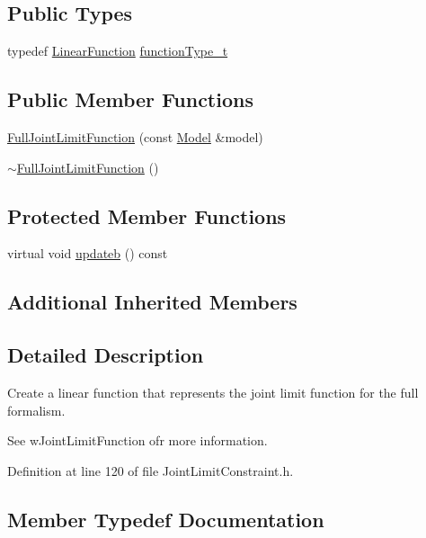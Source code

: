 \subsection*{Public Types}
\begin{DoxyCompactItemize}
\item 
typedef \hyperlink{classocra_1_1LinearFunction}{Linear\+Function} \hyperlink{classocra_1_1FullJointLimitFunction_a3ae743a316981d67933248a9d58f58fb}{function\+Type\+\_\+t}
\end{DoxyCompactItemize}
\subsection*{Public Member Functions}
\begin{DoxyCompactItemize}
\item 
\hyperlink{classocra_1_1FullJointLimitFunction_af49c77d067fe584cf6d3884eb33b2ed0}{Full\+Joint\+Limit\+Function} (const \hyperlink{classocra_1_1Model}{Model} \&model)
\item 
\hyperlink{classocra_1_1FullJointLimitFunction_a84cc9b5e7efdf78fe9a279ef5940871b}{$\sim$\+Full\+Joint\+Limit\+Function} ()
\end{DoxyCompactItemize}
\subsection*{Protected Member Functions}
\begin{DoxyCompactItemize}
\item 
virtual void \hyperlink{classocra_1_1FullJointLimitFunction_a3c9bcab2026535cc5f2c0176552d449d}{updateb} () const
\end{DoxyCompactItemize}
\subsection*{Additional Inherited Members}


\subsection{Detailed Description}
Create a linear function that represents the joint limit function for the full formalism. 

See w\+Joint\+Limit\+Function ofr more information. 

Definition at line 120 of file Joint\+Limit\+Constraint.\+h.



\subsection{Member Typedef Documentation}
\hypertarget{classocra_1_1FullJointLimitFunction_a3ae743a316981d67933248a9d58f58fb}{}\label{classocra_1_1FullJointLimitFunction_a3ae743a316981d67933248a9d58f58fb} 
